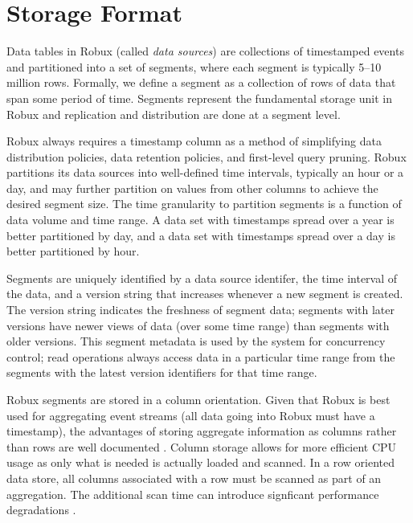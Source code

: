 \documentclass{sig-alternate-2013}
\begin{document}
\section{Storage Format}
\label{sec:storage-format}
Data tables in Robux (called \emph{data sources}) are collections of
timestamped events and partitioned into a set of segments, where each segment
is typically 5--10 million rows. Formally, we define a segment as a collection
of rows of data that span some period of time. Segments represent the
fundamental storage unit in Robux and replication and distribution are done at
a segment level.

Robux always requires a timestamp column as a method of simplifying data
distribution policies, data retention policies, and first-level query pruning.
Robux partitions its data sources into well-defined time intervals, typically
an hour or a day, and may further partition on values from other columns to
achieve the desired segment size. The time granularity
to partition segments is a function of data volume and time range. A data set
with timestamps spread over a year is better partitioned by day, and a data set
with timestamps spread over a day is better partitioned by hour.

Segments are uniquely identified by a data source identifer, the time interval
of the data, and a version string that increases whenever a new segment is
created. The version string indicates the freshness of segment data; segments
with later versions have newer views of data (over some time range) than
segments with older versions. This segment metadata is used by the system for
concurrency control; read operations always access data in a particular time
range from the segments with the latest version identifiers for that time
range.

Robux segments are stored in a column orientation. Given that Robux is best
used for aggregating event streams (all data going into Robux must have a
timestamp), the advantages of storing aggregate information as columns rather than
rows are well documented \cite{abadi2008column}. Column storage allows for more
efficient CPU usage as only what is needed is actually loaded and scanned. In a
row oriented data store, all columns associated with a row must be scanned as
part of an aggregation. The additional scan time can introduce signficant performance
degradations \cite{abadi2008column}.
\end{document}
